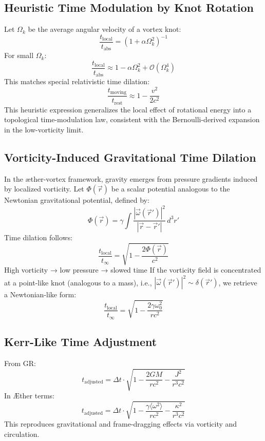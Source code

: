 \subsection{Heuristic Time Modulation by Knot Rotation}
Let $\Omega_k$ be the average angular velocity of a vortex knot:
\begin{equation}
    \label{eq:omegamod}
    \frac{t_{\text{local}}}{t_{\text{abs}}} = \left(1 + \alpha \Omega_k^2 \right)^{-1}
\end{equation}
For small $\Omega_k$:
\begin{equation}
    \frac{t_{\text{local}}}{t_{\text{abs}}} \approx 1 - \alpha \Omega_k^2 + \mathcal{O}(\Omega_k^4)
\end{equation}
This matches special relativistic time dilation:
\begin{equation}
    \frac{t_{\text{moving}}}{t_{\text{rest}}} \approx 1 - \frac{v^2}{2c^2}
\end{equation}
This heuristic expression generalizes the local effect of rotational energy into a topological time-modulation law, consistent with the Bernoulli-derived expansion in the low-vorticity limit.

\subsection{Vorticity-Induced Gravitational Time Dilation}
In the æther-vortex framework, gravity emerges from pressure gradients induced by localized vorticity.
Let $\Phi(\vec{r})$ be a scalar potential analogous to the Newtonian gravitational potential, defined by:
\begin{equation}
    \Phi(\vec{r}) = \gamma \int \frac{|\vec{\omega}(\vec{r}')|^2}{|\vec{r} - \vec{r}'|} \, d^3r'
\end{equation}
Time dilation follows:
\begin{equation}
    \frac{t_{\text{local}}}{t_{\infty}} = \sqrt{1 - \frac{2\Phi(\vec{r})}{c^2}}
\end{equation}
High vorticity → low pressure → slowed time
If the vorticity field is concentrated at a point-like knot (analogous to a mass), i.e., $|\vec{\omega}(\vec{r}')|^2 \sim \delta(\vec{r}')$, we retrieve a Newtonian-like form:
\begin{equation}
    \frac{t_{\text{local}}}{t_{\infty}} = \sqrt{1 - \frac{2\gamma \omega_0^2}{r c^2}}
\end{equation}

\subsection{Kerr-Like Time Adjustment}
From GR:
\begin{equation}
    t_{\text{adjusted}} = \Delta t \cdot \sqrt{1 - \frac{2GM}{rc^2} - \frac{J^2}{r^3 c^2}}
\end{equation}
In Æther terms:
\begin{equation}
    \boxed{t_{\text{adjusted}} = \Delta t \cdot \sqrt{1 - \frac{\gamma \langle \omega^2 \rangle}{r c^2} - \frac{\kappa^2}{r^3 c^2}}}
\end{equation}
This reproduces gravitational and frame-dragging effects via vorticity and circulation.

